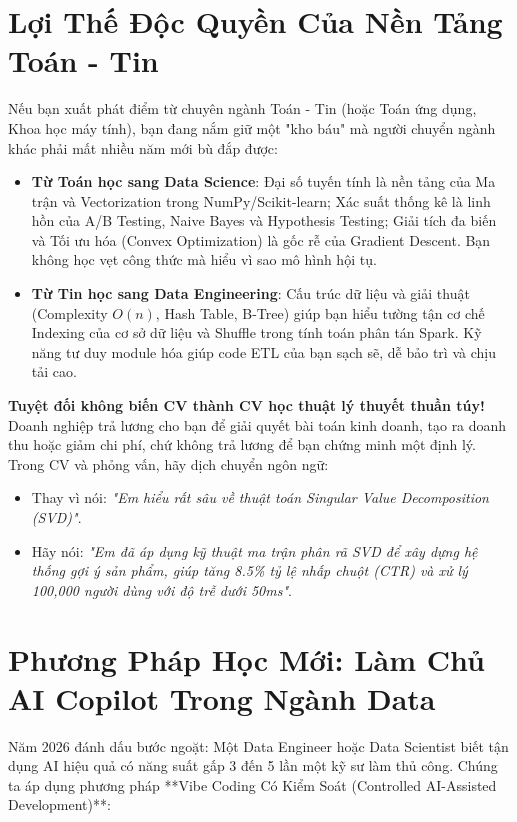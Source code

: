 \section{Lợi Thế Độc Quyền Của Nền Tảng Toán - Tin}

Nếu bạn xuất phát điểm từ chuyên ngành Toán - Tin (hoặc Toán ứng dụng, Khoa học máy tính), bạn đang nắm giữ một "kho báu" mà người chuyển ngành khác phải mất nhiều năm mới bù đắp được:
\begin{itemize}
    \item \textbf{Từ Toán học sang Data Science}: Đại số tuyến tính là nền tảng của Ma trận và Vectorization trong NumPy/Scikit-learn; Xác suất thống kê là linh hồn của A/B Testing, Naive Bayes và Hypothesis Testing; Giải tích đa biến và Tối ưu hóa (Convex Optimization) là gốc rễ của Gradient Descent. Bạn không học vẹt công thức mà hiểu vì sao mô hình hội tụ.
    \item \textbf{Từ Tin học sang Data Engineering}: Cấu trúc dữ liệu và giải thuật (Complexity $O(n)$, Hash Table, B-Tree) giúp bạn hiểu tường tận cơ chế Indexing của cơ sở dữ liệu và Shuffle trong tính toán phân tán Spark. Kỹ năng tư duy module hóa giúp code ETL của bạn sạch sẽ, dễ bảo trì và chịu tải cao.
\end{itemize}

\begin{cvtipbox}
\textbf{Tuyệt đối không biến CV thành CV học thuật lý thuyết thuần túy!}
Doanh nghiệp trả lương cho bạn để giải quyết bài toán kinh doanh, tạo ra doanh thu hoặc giảm chi phí, chứ không trả lương để bạn chứng minh một định lý. Trong CV và phỏng vấn, hãy dịch chuyển ngôn ngữ:
\begin{itemize}
    \item Thay vì nói: \textit{"Em hiểu rất sâu về thuật toán Singular Value Decomposition (SVD)"}.
    \item Hãy nói: \textit{"Em đã áp dụng kỹ thuật ma trận phân rã SVD để xây dựng hệ thống gợi ý sản phẩm, giúp tăng 8.5\% tỷ lệ nhấp chuột (CTR) và xử lý 100,000 người dùng với độ trễ dưới 50ms"}.
\end{itemize}
\end{cvtipbox}

\section{Phương Pháp Học Mới: Làm Chủ AI Copilot Trong Ngành Data}

Năm 2026 đánh dấu bước ngoặt: Một Data Engineer hoặc Data Scientist biết tận dụng AI hiệu quả có năng suất gấp 3 đến 5 lần một kỹ sư làm thủ công. Chúng ta áp dụng phương pháp **Vibe Coding Có Kiểm Soát (Controlled AI-Assisted Development)**:

